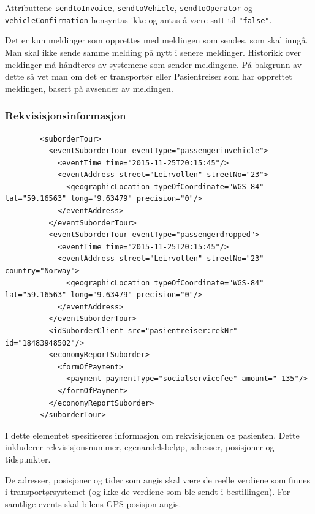 \documentclass[a4paper,titlepage,norsk,11pt]{article}
\begin{document}
\begin{description}
  Attributtene \lstinline{sendtoInvoice}, \lstinline{sendtoVehicle}, \lstinline{sendtoOperator} og  \lstinline{vehicleConfirmation} hensyntas ikke og antas å være satt til \lstinline{"false"}.

  Det er kun meldinger som opprettes med meldingen som sendes, som skal inngå. Man skal ikke sende samme melding på nytt i senere meldinger. Historikk over meldinger må håndteres av systemene som sender meldingene. På bakgrunn av dette så vet man om det er transportør eller Pasientreiser som har opprettet meldingen, basert på avsender av meldingen.

\end{description}

\subsubsection{Rekvisisjonsinformasjon}

\begin{lstlisting}
        <suborderTour>
          <eventSuborderTour eventType="passengerinvehicle">
            <eventTime time="2015-11-25T20:15:45"/>
            <eventAddress street="Leirvollen" streetNo="23">
              <geographicLocation typeOfCoordinate="WGS-84" lat="59.16563" long="9.63479" precision="0"/>
            </eventAddress>
          </eventSuborderTour>
          <eventSuborderTour eventType="passengerdropped">
            <eventTime time="2015-11-25T20:15:45"/>
            <eventAddress street="Leirvollen" streetNo="23" country="Norway">
              <geographicLocation typeOfCoordinate="WGS-84" lat="59.16563" long="9.63479" precision="0"/>
            </eventAddress>
          </eventSuborderTour>
          <idSuborderClient src="pasientreiser:rekNr" id="18483948502"/>
          <economyReportSuborder>
            <formOfPayment>
              <payment paymentType="socialservicefee" amount="-135"/>
            </formOfPayment>
          </economyReportSuborder>
        </suborderTour>
\end{lstlisting}

I dette elementet spesifiseres informasjon om rekvisisjonen og pasienten. Dette inkluderer rekvisisjonsnummer, egenandelsbeløp, adresser, posisjoner og tidspunkter.

De adresser, posisjoner og tider som angis skal være de reelle verdiene som finnes i transportørsystemet (og ikke de verdiene som ble sendt i bestillingen). For samtlige events skal bilens GPS-posisjon angis.
\end{document}

